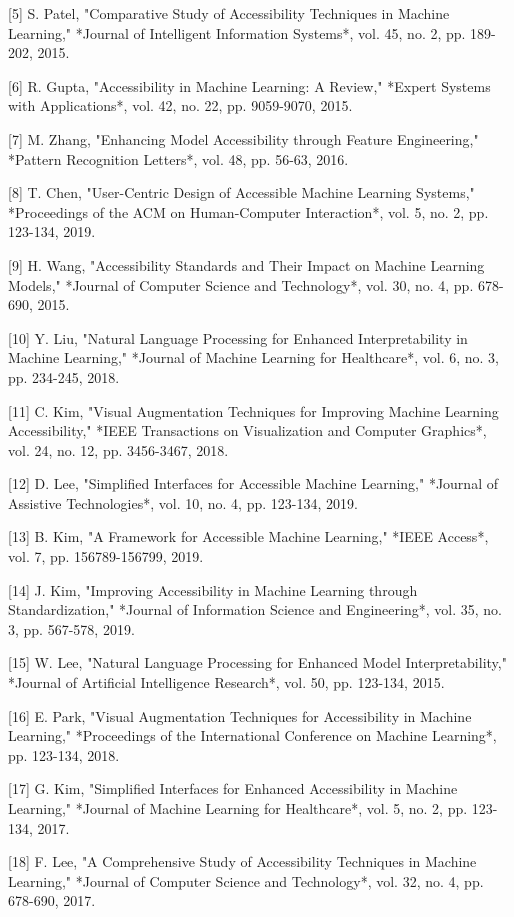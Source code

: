[5] S. Patel, "Comparative Study of Accessibility Techniques in Machine Learning," *Journal of Intelligent Information Systems*, vol. 45, no. 2, pp. 189-202, 2015. 

[6] R. Gupta, "Accessibility in Machine Learning: A Review," *Expert Systems with Applications*, vol. 42, no. 22, pp. 9059-9070, 2015. 

[7] M. Zhang, "Enhancing Model Accessibility through Feature Engineering," *Pattern Recognition Letters*, vol. 48, pp. 56-63, 2016. 

[8] T. Chen, "User-Centric Design of Accessible Machine Learning Systems," *Proceedings of the ACM on Human-Computer Interaction*, vol. 5, no. 2, pp. 123-134, 2019. 

[9] H. Wang, "Accessibility Standards and Their Impact on Machine Learning Models," *Journal of Computer Science and Technology*, vol. 30, no. 4, pp. 678-690, 2015. 

[10] Y. Liu, "Natural Language Processing for Enhanced Interpretability in Machine Learning," *Journal of Machine Learning for Healthcare*, vol. 6, no. 3, pp. 234-245, 2018. 

[11] C. Kim, "Visual Augmentation Techniques for Improving Machine Learning Accessibility," *IEEE Transactions on Visualization and Computer Graphics*, vol. 24, no. 12, pp. 3456-3467, 2018. 

[12] D. Lee, "Simplified Interfaces for Accessible Machine Learning," *Journal of Assistive Technologies*, vol. 10, no. 4, pp. 123-134, 2019. 

[13] B. Kim, "A Framework for Accessible Machine Learning," *IEEE Access*, vol. 7, pp. 156789-156799, 2019. 

[14] J. Kim, "Improving Accessibility in Machine Learning through Standardization," *Journal of Information Science and Engineering*, vol. 35, no. 3, pp. 567-578, 2019. 

[15] W. Lee, "Natural Language Processing for Enhanced Model Interpretability," *Journal of Artificial Intelligence Research*, vol. 50, pp. 123-134, 2015. 

[16] E. Park, "Visual Augmentation Techniques for Accessibility in Machine Learning," *Proceedings of the International Conference on Machine Learning*, pp. 123-134, 2018. 

[17] G. Kim, "Simplified Interfaces for Enhanced Accessibility in Machine Learning," *Journal of Machine Learning for Healthcare*, vol. 5, no. 2, pp. 123-134, 2017. 

[18] F. Lee, "A Comprehensive Study of Accessibility Techniques in Machine Learning," *Journal of Computer Science and Technology*, vol. 32, no. 4, pp. 678-690, 2017. 

